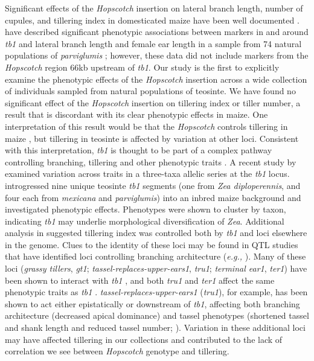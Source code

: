 \documentclass[11pt]{article}
\begin{document}
\begin{linenumbers}
\begin{flushleft}
Significant effects of the \emph{Hopscotch} insertion on lateral branch length, number of cupules, and tillering index in domesticated maize have been well documented \citep{Studer2011}.  \citet{Weber2007} have described significant phenotypic associations between markers in and around \emph{tb1} and lateral branch length and female ear length in a sample from 74 natural populations of \emph{parviglumis} \citep{Weber2007}; however, these data did not include markers from the \emph{Hopscotch} region 66kb upstream of \emph{tb1}. Our study is the first to explicitly examine the phenotypic effects of the \emph{Hopscotch} insertion across a wide collection of individuals sampled from natural populations of teosinte. We have found no significant effect of the \emph{Hopscotch} insertion on tillering index or tiller number, a result that is discordant with its clear phenotypic effects in maize. One interpretation of this result would be that the \emph{Hopscotch} controls tillering in maize \citep{Studer2011}, but tillering in teosinte is affected by variation at other loci. Consistent with this interpretation, \emph{tb1} is thought to be part of a complex pathway controlling branching, tillering and other phenotypic traits \citep{KebromBrutnell2007, Clark2006}. A recent study by \citet{StuderDoebley2012} examined variation across traits in a three-taxa allelic series at the \emph{tb1} locus. \citet{StuderDoebley2012} introgressed nine unique teosinte \emph{tb1} segments (one from \emph{Zea diploperennis}, and four each from \emph{mexicana} and \emph{parviglumis}) into an inbred maize background and investigated phenotypic effects. Phenotypes were shown to cluster by taxon, indicating \emph{tb1} may underlie morphological diversification of \emph{Zea}. Additional analysis in \citet{StuderDoebley2012} suggested tillering index was controlled both by \emph{tb1} and loci elsewhere in the genome.  Clues to the identity of these loci may be found in QTL studies that have identified loci controlling branching architecture (\emph{e.g.,} \citealt{DoebleyStec1991, DoebleyStec1993}). Many of these loci (\emph{grassy tillers}, \emph{gt1}; \emph{tassel-replaces-upper-ears1}, \emph{tru1}; \emph{terminal ear1}, \emph{ter1}) have been shown to interact with \emph{tb1} \citep{Whipple2011, Li2012},  and both \emph{tru1} and \emph{ter1} affect the same phenotypic traits as \emph{tb1} \citep{DoebleyStecGustus1995}. \emph{tassel-replaces-upper-ears1} (\emph{tru1}), for example, has been shown to act either epistatically or downstream of \emph{tb1}, affecting both branching architecture (decreased apical dominance) and tassel phenotypes (shortened tassel and shank length and reduced tassel number; \citealt{Li2012}). Variation in these additional loci may have affected tillering in our collections and contributed to the lack of correlation we see between \emph{Hopscotch} genotype and tillering. 


\end{flushleft}
\end{linenumbers}
\end{document}
